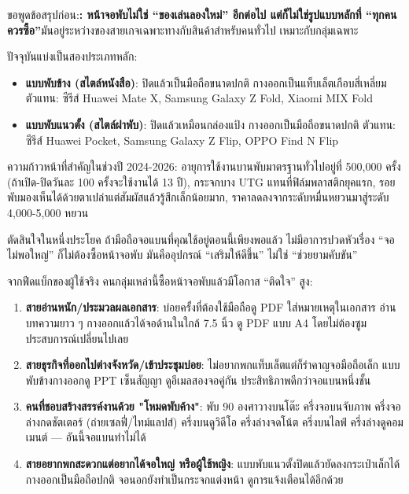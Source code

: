 


ขอพูดข้อสรุปก่อน:\textbf{: หน้าจอพับไม่ใช่ “ของเล่นลองใหม่” อีกต่อไป แต่ก็ไม่ใช่รูปแบบหลักที่ “ทุกคนควรซื้อ”}มันอยู่ระหว่างของสายเกจเฉพาะทางกับสินค้าสำหรับคนทั่วไป เหมาะกับกลุ่มเฉพาะ

ปัจจุบันแบ่งเป็นสองประเภทหลัก:

\begin{itemize}
  \item \textbf{แบบพับข้าง (สไตล์หนังสือ)}: ปิดแล้วเป็นมือถือขนาดปกติ กางออกเป็นแท็บเล็ตเกือบสี่เหลี่ยม ตัวแทน: ซีรีส์ Huawei Mate X, Samsung Galaxy Z Fold, Xiaomi MIX Fold
  \item \textbf{แบบพับแนวตั้ง (สไตล์ฝาพับ)}: ปิดแล้วเหมือนกล่องแป้ง กางออกเป็นมือถือขนาดปกติ ตัวแทน: ซีรีส์ Huawei Pocket, Samsung Galaxy Z Flip, OPPO Find N Flip
\end{itemize}

ความก้าวหน้าที่สำคัญในช่วงปี 2024-2026: อายุการใช้งานบานพับมาตรฐานทั่วไปอยู่ที่ 500,000 ครั้ง (ถ้าเปิด-ปิดวันละ 100 ครั้งจะใช้งานได้ 13 ปี), กระจกบาง UTG แทนที่ฟิล์มพลาสติกยุคแรก, รอยพับมองเห็นได้ด้วยตาเปล่าแต่สัมผัสแล้วรู้สึกเล็กน้อยมาก, ราคาลดลงจากระดับหมื่นหยวนมาสู่ระดับ 4,000-5,000 หยวน

\begin{tcbinfo}{ตัดสินใจในหนึ่งประโยค}
ถ้ามือถือจอแบนที่คุณใช้อยู่ตอนนี้เพียงพอแล้ว ไม่มีอาการปวดหัวเรื่อง “จอไม่พอใหญ่” ก็ไม่ต้องซื้อหน้าจอพับ มันคืออุปกรณ์ “เสริมให้ดีขึ้น” ไม่ใช่ “ช่วยยามคับขัน”

\end{tcbinfo}


จากฟีดแบ็กของผู้ใช้จริง คนกลุ่มเหล่านี้ซื้อหน้าจอพับแล้วมีโอกาส “ติดใจ” สูง:

\begin{enumerate}
  \item \textbf{สายอ่านหนัก/ประมวลผลเอกสาร}: บ่อยครั้งที่ต้องใช้มือถือดู PDF ใส่หมายเหตุในเอกสาร อ่านบทความยาว ๆ กางออกแล้วได้จอด้านในใกล้ 7.5 นิ้ว ดู PDF แบบ A4 โดยไม่ต้องซูม ประสบการณ์เปลี่ยนไปเลย
  \item \textbf{สายธุรกิจที่ออกไปต่างจังหวัด/เข้าประชุมบ่อย}: ไม่อยากพกแท็บเล็ตแต่ก็รำคาญจอมือถือเล็ก แบบพับข้างกางออกดู PPT เซ็นสัญญา ดูอีเมลสองจอคู่กัน ประสิทธิภาพดีกว่าจอแบนหนึ่งชั้น
  \item \textbf{คนที่ชอบสร้างสรรค์งานด้วย "โหมดพับค้าง"}: พับ 90 องศาวางบนโต๊ะ ครึ่งจอบนจับภาพ ครึ่งจอล่างกดชัตเตอร์ (ถ่ายเซลฟี่/ไทม์แลปส์) ครึ่งบนดูวิดีโอ ครึ่งล่างจดโน้ต ครึ่งบนไลฟ์ ครึ่งล่างดูคอมเมนต์ — อันนี้จอแบนทำไม่ได้
  \item \textbf{สายอยากพกสะดวกแต่อยากได้จอใหญ่ หรือผู้ใช้หญิง}: แบบพับแนวตั้งปิดแล้วยัดลงกระเป๋าเล็กได้ กางออกเป็นมือถือปกติ จอนอกยังทำเป็นกระจกแต่งหน้า ดูการแจ้งเตือนได้อีกด้วย
\end{enumerate}

